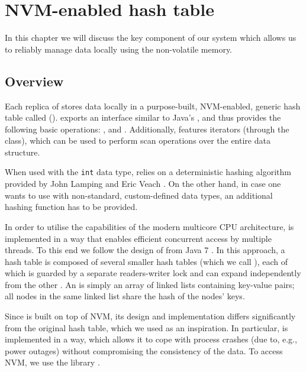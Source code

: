 \chapter{NVM-enabled hash table} \label{OwnWork}
In this chapter we will discuss the key component of our system which allows us to reliably manage data locally using the non-volatile memory. 

\section{Overview}

    Each replica of \DHTS stores data locally in a purpose-built, NVM-enabled, generic hash table called \emph{\PersistentHashTable} (\PHT). \PHT exports an interface similar to Java's \HashMap \cite{HashMapJava}, and thus provides the following basic operations: \insertMethod, \getMethod and \removeMethod. Additionally, \PHT features iterators (through the \Iterator class), which can be used to perform scan operations over the entire data structure.
    
    When used with the \texttt{int} data type, \PHT relies on a deterministic hashing algorithm provided by John Lamping and Eric Veach \cite{Hashing}. On the other hand, in case one wants to use \PHT with non-standard, custom-defined data types, an additional hashing function has to be provided.
    
    In order to utilise the capabilities of the modern multicore CPU architecture, \PHT is implemented in a way that enables efficient concurrent access by multiple threads. 
    To this end we follow the design of \ConcurrentHashMap from Java 7 \cite{ConcurrentHashMapJava}. 
    In this approach, a hash table is composed of several smaller hash tables (which we call \internalHashMaps), each of which is guarded by a separate readers-writer lock and can expand independently from the other \internalHashMaps. 
    An \internalHashMap is simply an array of linked lists containing key-value pairs; all nodes in the same linked list share the hash of the nodes' keys.
    
    Since \PHT is built on top of NVM, its design and implementation differs significantly from the original hash table, which we used as an inspiration. 
    In particular, \PHT is implemented in a way, which allows it to cope with process crashes (due to, e.g., power outages) without compromising the consistency of the data. 
    To access NVM, we use the \libpmemobj library \cite{Libpmemobj}.
    
